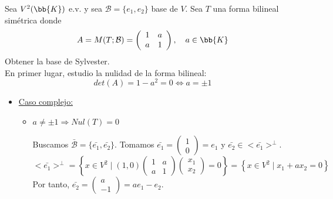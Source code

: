 \begin{ejercicio}
    Sea $V^2(\bb{K})$ e.v. y sea $\mathcal{B} = \{e_1, e_2\}$ base de $V$. Sea $T$ una forma bilineal simétrica donde
    \begin{equation*}
        A=M(T;\mathcal{B}) = \left( \begin{array}{cc}
            1 & a \\
            a & 1
        \end{array} \right),\quad a\in \bb{K}
    \end{equation*}
    Obtener la base de Sylvester.\\

    En primer lugar, estudio la nulidad de la forma bilineal:
    $$det(A)=1-a^2 = 0 \Longleftrightarrow a = \pm 1$$
    \begin{itemize}
        \item \underline{Caso complejo:}
        \begin{itemize}
            \item $a\neq \pm 1 \Longrightarrow Nul(T)=0$

            Buscamos $\bar{\mathcal{B}} = \{\bar{e_1}, \bar{e_2}\}$. Tomamos $\bar{e_1} = \left( \begin{array}{c}
                1 \\ 0
            \end{array}\right) = e_1$ y $\bar{e_2} \in <\bar{e_1}>^\perp$.
            \begin{equation*}
                <\bar{e_1}>^\perp = \left\{ x\in V^2 \mid (1,0) \left( \begin{array}{cc}
                    1 & a \\
                    a & 1
                \end{array} \right) \left( \begin{array}{c}
                    x_1 \\ x_2
                \end{array}\right) = 0\right\} = \left\{ x \in V^2 \mid x_1 + ax_2 = 0\right\}
            \end{equation*}
            Por tanto, $\bar{e_2}=\left( \begin{array}{c}
                a \\ -1
            \end{array}\right) = ae_1-e_2$.


\end{itemize}
\end{itemize}
\end{ejercicio}

